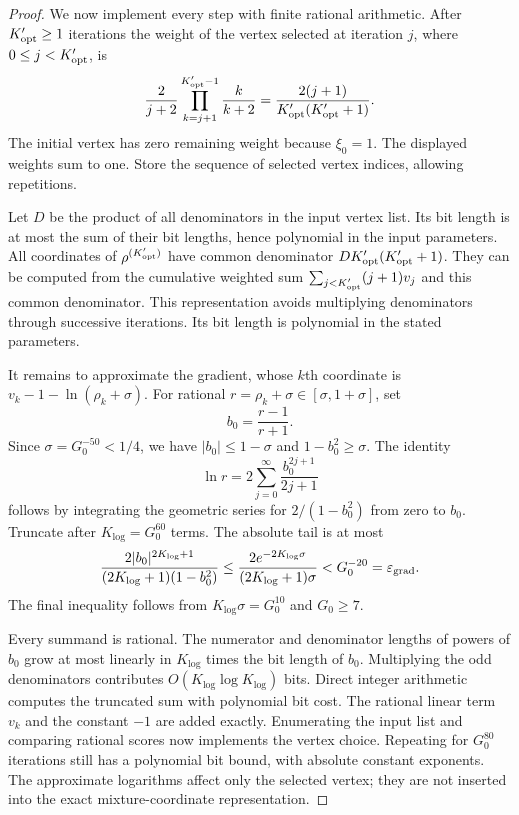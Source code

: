 \documentclass[11pt]{article}
\theoremstyle{definition}
\newcommand{\1}{\mathbf 1}
\begin{document}
\begin{proof}
We now implement every step with finite rational arithmetic.
After $K_{\rm opt}'\ge1$ iterations the weight of the vertex selected at
iteration $j$, where $0\le j<K_{\rm opt}'$, is
\[
 \frac2{j+2}\prod_{k=j+1}^{K_{\rm opt}'-1}\frac{k}{k+2}
 =\frac{2(j+1)}{K_{\rm opt}'(K_{\rm opt}'+1)}.
\]
The initial vertex has zero remaining weight because $\xi_0=1$.
The displayed weights sum to one. Store the sequence of selected
vertex indices, allowing repetitions.

Let $D$ be the product of all denominators in the input vertex list.
Its bit length is at most the sum of their bit lengths, hence polynomial
in the input parameters. All coordinates of $\rho^{(K_{\rm opt}')}$ have common
denominator $DK_{\rm opt}'(K_{\rm opt}'+1)$. They can be computed from the cumulative weighted
sum $\sum_{j<K_{\rm opt}'}(j+1)v_j$ and this common denominator.
This representation avoids multiplying denominators through successive
iterations. Its bit length is polynomial in the stated parameters.

It remains to approximate the gradient, whose $k$th coordinate is
$v_k-1-\ln(\rho_k+\sigma)$. For rational
$r=\rho_k+\sigma\in[\sigma,1+\sigma]$, set
\[
 b_0=\frac{r-1}{r+1}.
\]
Since $\sigma=G_0^{-50}<1/4$, we have $|b_0|\le1-\sigma$ and
$1-b_0^2\ge\sigma$. The identity
\[
 \ln r=2\sum_{j=0}^{\infty}\frac{b_0^{2j+1}}{2j+1}
\]
follows by integrating the geometric series for $2/(1-b_0^2)$ from
zero to $b_0$. Truncate after $K_{\log}=G_0^{60}$ terms. The absolute tail
is at most
\[
 \frac{2|b_0|^{2K_{\log}+1}}
 {(2K_{\log}+1)(1-b_0^2)}
 \le
 \frac{2e^{-2K_{\log}\sigma}}
 {(2K_{\log}+1)\sigma}
 <G_0^{-20}=\varepsilon_{\rm grad}.
\]
The final inequality follows from $K_{\log}\sigma=G_0^{10}$ and $G_0\ge7$.

Every summand is rational. The numerator and denominator lengths of
powers of $b_0$ grow at most linearly in $K_{\log}$ times the bit length
of $b_0$. Multiplying the odd denominators contributes
$O(K_{\log}\log K_{\log})$ bits.
Direct integer arithmetic computes the truncated sum with polynomial bit cost.
The rational linear
term $v_k$ and the constant $-1$ are added exactly.
Enumerating the input list and comparing rational scores now implements
the vertex choice. Repeating for $G_0^{80}$ iterations still has a
polynomial bit bound, with absolute constant exponents.
The approximate logarithms affect only the selected vertex; they are not
inserted into the exact mixture-coordinate representation.


\end{proof}
\end{document}
